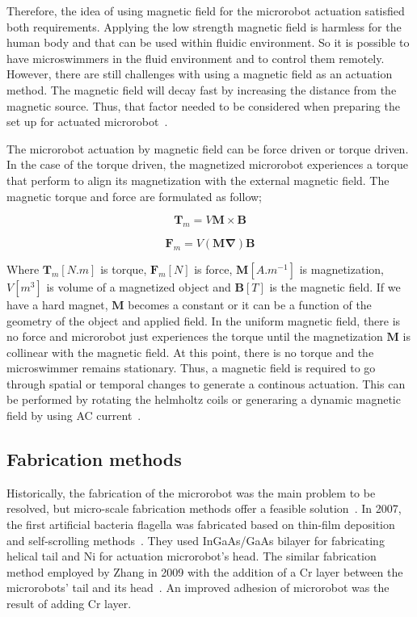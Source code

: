 \documentclass[12pt,a4paper,titlepage]{report}
\begin{document}
Therefore, the idea of using magnetic field for the microrobot actuation satisfied both requirements. 
Applying the low strength magnetic field is harmless for the human body and that can be used within fluidic 
environment. So it is possible to have microswimmers in the fluid environment and to control them remotely. However, 
there are still challenges with using a magnetic field as an actuation method. The magnetic field will decay 
fast by increasing the distance from the magnetic source. Thus, that factor needed to be considered 
when preparing the set up for actuated microrobot~\citep{peyer2013bio}.   

The microrobot actuation by magnetic field can be force driven or torque driven. In the case of the torque 
driven, the magnetized microrobot experiences a torque that perform to align its magnetization with the 
external magnetic field. The magnetic torque and force are formulated as follow;



\begin{equation}
  \bm{T}_m = V\bm{M} \times \bm{B}
\label{originalForce}
\end{equation}


\begin{equation}
  \bm{F}_m = V(\bm{M\nabla}) \bm{B}
\label{originalTorque}
\end{equation}

Where $\bm{T}_m [N.m]$ is torque, $\bm{F}_m [N]$ is force, $\bm{M} [A.m^{-1}]$ is magnetization, $V [m^3]$ is
volume of a magnetized object and $\bm{B} [T]$ is the magnetic field. If we have a hard magnet, $\bm{M}$ becomes
a constant or it can be a function of the geometry of the object and applied field. In the uniform magnetic field, 
there is no force and microrobot just experiences the torque until the magnetization $\bm{M}$ is collinear with the
magnetic field. At this point, there is no torque and the microswimmer remains stationary. Thus, a magnetic field is required 
to go through spatial or temporal changes to generate a continous actuation. This can be performed by 
rotating the helmholtz coils or generaring a dynamic magnetic field by using AC current~\citep{peyer2013bio}.




\subsection{Fabrication methods} \label{fabrication}

Historically, the fabrication of the microrobot was the main problem to be resolved, but micro-scale fabrication methods 
offer a feasible solution~\citep{gao2013bioinspired}.
In 2007, the first artificial bacteria flagella was fabricated based on thin-film deposition and self-scrolling
 methods~\citep{qiu2014noncytotoxic}. They used InGaAs/GaAs bilayer for fabricating
helical tail and Ni for actuation microrobot\rq{}s head. The similar fabrication method employed by Zhang
 in 2009 with the addition of a Cr layer between the microrobots\rq{} tail and its head~\citep{qiu2014noncytotoxic}.
An improved adhesion of microrobot was the result of adding Cr layer. 
\end{document}
